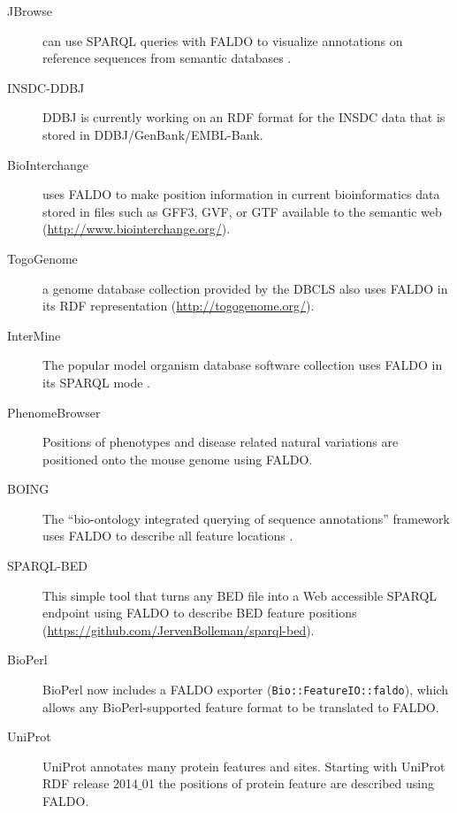 \begin{description}
\item[JBrowse] can use SPARQL queries with FALDO to visualize annotations on reference sequences from semantic databases \cite{JBrowse}.
\item[INSDC-DDBJ] DDBJ is currently working on an RDF format for the INSDC data that is stored in DDBJ/GenBank/EMBL-Bank.
\item[BioInterchange] uses FALDO to make position information in current bioinformatics data stored in files such as GFF3, GVF, or GTF available to the semantic web (\url{http://www.biointerchange.org/}).
\item[TogoGenome] a genome database collection provided by the DBCLS also uses FALDO in its RDF representation (\url{http://togogenome.org/}).
\item[InterMine] The popular model organism database software collection uses FALDO in its SPARQL mode \cite{InterMine}.
\item[PhenomeBrowser] Positions of phenotypes and disease related natural variations are positioned onto the mouse genome using FALDO.
\item[BOING] The ``bio-ontology integrated querying of sequence annotations'' framework uses FALDO to describe all feature locations \cite{BOING}.
\item[SPARQL-BED] This simple tool that turns any BED file into a Web accessible SPARQL endpoint using FALDO to describe BED feature positions (\url{https://github.com/JervenBolleman/sparql-bed}).
\item[BioPerl] BioPerl\cite{BioPerl2002} now includes a FALDO exporter (\texttt{Bio::FeatureIO::faldo}), which allows any BioPerl-supported feature format to be translated to FALDO.
\item[UniProt] UniProt annotates many protein features and sites. Starting with UniProt RDF release 2014$\_$01 the positions of protein feature are described using FALDO.
\end{description}

